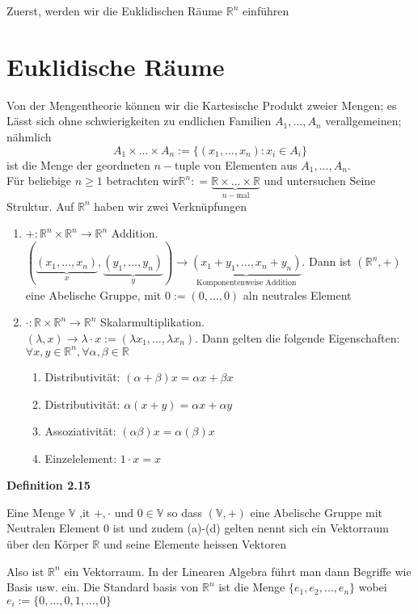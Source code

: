 \noindent Zuerst, werden wir die Euklidischen Räume $\mathbb{R}^n$ einführen
\section{Euklidische Räume}
Von der Mengentheorie können wir die Kartesische Produkt zweier Mengen; es Lässt sich ohne schwierigkeiten zu endlichen Familien $A_1,\dots ,A_n$ verallgemeinen; nähmlich $$A_1\times\dots\times A_n:=\{\left(x_1,\dots ,x_n\right):x_i\in A_i \}$$ ist die Menge der geordneten $n-$tuple von Elementen aus $A_1,\dots ,A_n$.\\

Für beliebige $n\geq 1$ betrachten wir$ \mathbb{R}^n: = \underbrace {\mathbb{R} \times  \ldots  \times \mathbb{R} }_{n - {\text{mal}}}$ und untersuchen Seine Struktur. Auf $\mathbb{R}^n$ haben wir zwei Verknüpfungen
\begin{enumerate}
    \item $+:\mathbb{R}^n\times\mathbb{R}^n\rightarrow\mathbb{R}^n$ Addition.\\
$\left( {\underbrace {\left( {{x_1}, \ldots ,{x_n}} \right)}_x,\underbrace {\left( {{y_1}, \ldots ,{y_n}} \right)}_y} \right) \to \underbrace {\left( {{x_1} + {y_1}, \ldots ,{x_n} + {y_n}} \right)}_{{\text{Komponentenweise Addition}}}$. Dann ist $\left( \mathbb{R}^n,+\right)$ eine Abelische Gruppe, mit $0:=(0,\dots,0)$ aln neutrales Element
\item $\cdot:\mathbb{R}\times\mathbb{R}^n\rightarrow\mathbb{R}^n$ Skalarmultiplikation.\\
$(\lambda,x)\rightarrow\lambda\cdot x:=(\lambda x_1,\dots,\lambda x_n)$. Dann gelten die folgende Eigenschaften: $\forall x,y\in\mathbb{R}^n,\forall \alpha,\beta\in\mathbb{R}$ 
\begin{enumerate}
\item Distributivität: $\left( \alpha+\beta\right) x=\alpha x+\beta x$
\item Distributivität: $\alpha\left(x+y\right) = \alpha x+\alpha y$
\item Assoziativität: $\left( \alpha\beta\right) x=\alpha\left( \beta\right) x$
\item Einzelelement: $1\cdot x=x$
\end{enumerate}
\end{enumerate}

\begin{framed}
\centerline{\textbf{Definition 2.15}}
\noindent Eine Menge $\mathbb{V}$ ,it $+,\cdot$ und $0\in\mathbb{V}$ so dass $\left(\mathbb{V},+\right)$ eine Abelische Gruppe mit Neutralen Element 0 ist und zudem (a)-(d) gelten nennt sich ein Vektorraum über den Körper $\mathbb{R}$ und seine Elemente heissen Vektoren
\end{framed}
Also ist $\mathbb{R}^n$ ein Vektorraum. In der Linearen Algebra führt man dann Begriffe wie Basis usw. ein. Die Standard basis von $\mathbb{R}^n$ ist die Menge $\{e_1,e_2,\dots,e_n \}$ wobei $e_i:=\{0,\dots,0,1,\dots,0\}$ \\

